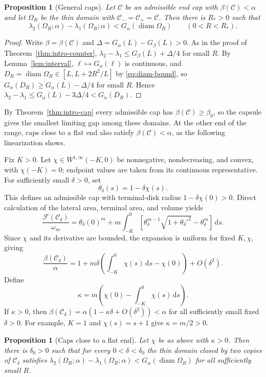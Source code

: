 \documentclass[11pt,a4paper]{article}
\numberwithin{equation}{section}
\theoremstyle{paperplain}
\newtheorem{proposition}[theorem]{Proposition}
\theoremstyle{remark}
\newcommand{\C}{\mathcal{C}}
\newcommand{\dd}{\,\mathrm d}
\newcommand{\diam}{\operatorname{diam}}
\begin{document}
\begin{proposition}[General caps]\label{prop:general-cap}
Let $\C$ be an admissible end cap with $\beta(\C)<\alpha$ and let
$\Omega_R$ be the thin domain with $\C_-=\C_+=\C$. Then there is $R_*>0$
such that
\[
 \lambda_2(\Omega_R;\alpha)-\lambda_1(\Omega_R;\alpha)<G_\alpha(\diam\Omega_R)
 \qquad(0<R<R_*).
\]
\end{proposition}

\begin{proof}
Write $\beta=\beta(\C)$ and $\Delta=G_\alpha(L)-G_\beta(L)>0$. As in the
proof of Theorem~\ref{thm:intro-counter},
$\lambda_2-\lambda_1\le G_\beta(L)+\Delta/4$ for small $R$. By
Lemma~\ref{lem:interval}, $\ell\mapsto G_\alpha(\ell)$ is continuous, and
$D_R=\diam\Omega_R\in[L,L+2R^2/L]$ by \eqref{eq:diam-bound}, so
$G_\alpha(D_R)\ge G_\alpha(L)-\Delta/4$ for small $R$. Hence
$\lambda_2-\lambda_1\le G_\alpha(L)-3\Delta/4<G_\alpha(D_R)$.
\end{proof}

By Theorem~\ref{thm:intro-cap} every admissible cap has $\beta(\C)\ge\beta_0$,
so the capsule gives the smallest limiting gap among these domains. At the
other end of the range, caps close to a flat end also satisfy
$\beta(\C)<\alpha$, as the following linearization shows.

Fix $K>0$. Let $\chi\in W^{1,\infty}(-K,0)$ be nonnegative, nondecreasing,
and convex, with $\chi(-K)=0$; endpoint values are taken from its continuous
representative. For sufficiently small $\delta>0$, set
\[
 \theta_\delta(s)=1-\delta\chi(s).
\]
This defines an admissible cap with terminal-disk radius
$1-\delta\chi(0)>0$. Direct calculation of the lateral area, terminal area,
and volume yields
\[
 \frac{\mathcal F(\C_\delta)}{\omega_m}
 =\theta_\delta(0)^m
  +m\int_{-K}^0\left[
       \theta_\delta^{m-1}\sqrt{1+\theta_\delta'^2}
       -\theta_\delta^m\right]\dd s.
\]
Since $\chi$ and its derivative are bounded, the expansion is uniform for
fixed $K,\chi$, giving
\begin{equation}\label{eq:linearization}
 \frac{\beta(\C_\delta)}{\alpha}
 =1+m\delta\left(\int_{-K}^0\chi(s)\dd s-\chi(0)\right)+O(\delta^2).
\end{equation}
Define
\[
 \kappa=m\left(\chi(0)-\int_{-K}^0\chi(s)\dd s\right).
\]
If $\kappa>0$, then
$\beta(\C_\delta)=\alpha(1-\kappa\delta+O(\delta^2))<\alpha$ for all
sufficiently small fixed $\delta>0$. For example, $K=1$ and
$\chi(s)=s+1$ give $\kappa=m/2>0$.

\begin{proposition}[Caps close to a flat end]\label{prop:nearflat}
Let $\chi$ be as above with $\kappa>0$. Then there is $\delta_0>0$ such
that for every $0<\delta<\delta_0$ the thin domain closed by two copies of
$\C_\delta$ satisfies
$\lambda_2(\Omega_R;\alpha)-\lambda_1(\Omega_R;\alpha)<G_\alpha(\diam\Omega_R)$
for all sufficiently small $R$.
\end{proposition}
\end{document}
